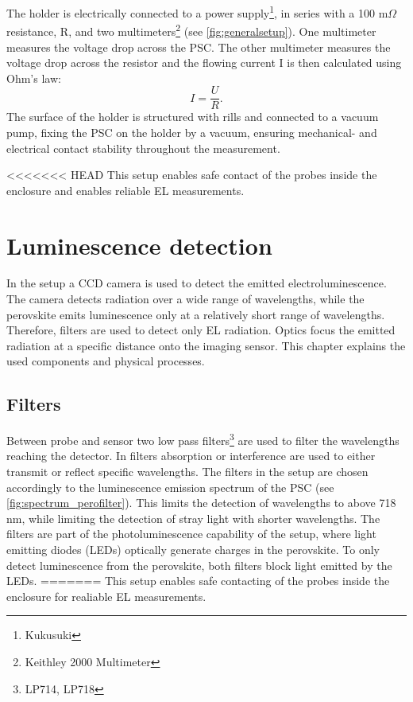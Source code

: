 The holder is electrically connected to a power supply\footnote{Kukusuki}, in series with a 100 m$\Omega$ resistance, R, and two multimeters\footnote{Keithley 2000 Multimeter} (see \autoref{fig:generalsetup}). One multimeter measures the voltage drop across the PSC. The other multimeter measures the voltage drop across the resistor and the flowing current I is then calculated using Ohm's law:
\begin{equation}
	I = \frac{U}{R}.
\end{equation}
The surface of the holder is structured with rills and connected to a vacuum pump, fixing the PSC on the holder by a vacuum, ensuring mechanical- and electrical contact stability throughout the measurement.

<<<<<<< HEAD
This setup enables safe contact of the probes inside the enclosure and enables reliable EL measurements.

\section{Luminescence detection}\label{sec:luminescencedetection}
In the setup a CCD camera is used to detect the emitted electroluminescence. The camera detects radiation over a wide range of wavelengths, while the perovskite emits luminescence only at a relatively short range of wavelengths. Therefore, filters are used to detect only EL radiation. Optics focus the emitted radiation at a specific distance onto the imaging sensor. This chapter explains the used components and physical processes.
\subsection{Filters}
Between probe and sensor two low pass filters\footnote{LP714, LP718} are used to filter the wavelengths reaching the detector. In filters absorption or interference are used to either transmit or reflect specific wavelengths. The filters in the setup are chosen accordingly to the luminescence emission spectrum of the PSC (see \autoref{fig:spectrum_perofilter}). This limits the detection of wavelengths to above 718 nm, while limiting the detection of stray light with shorter wavelengths. The filters are part of the photoluminescence capability of the setup, where light emitting diodes (LEDs) optically generate charges in the perovskite. To only detect luminescence from the perovskite, both filters block light emitted by the LEDs.
=======
This setup enables safe contacting of the probes inside the enclosure for realiable EL measurements.

